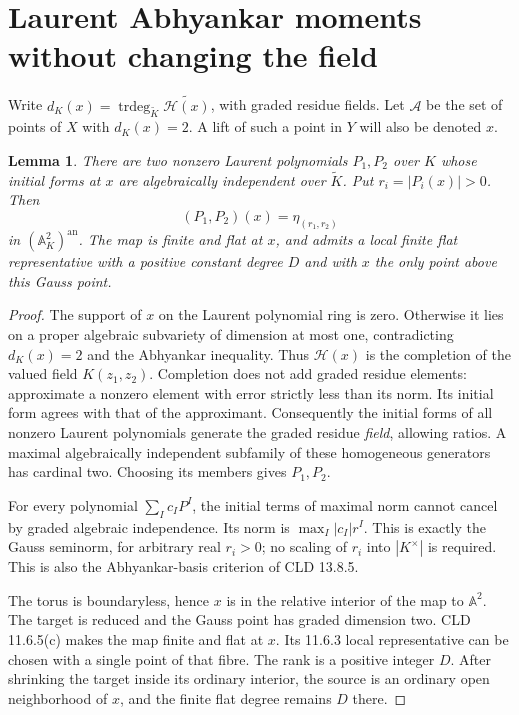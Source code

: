 \documentclass[11pt]{article}
\newtheorem{lemma}[theorem]{Lemma}
\theoremstyle{remark}\newtheorem{remark}[theorem]{Remark}
\begin{document}
\section{Laurent Abhyankar moments without changing the field}
Write $d_K(x)=\operatorname{trdeg}_{\widetilde K}
\widetilde{\mathscr H(x)}$, with graded residue fields.
Let $\mathscr A$ be the set of points of $X$ with $d_K(x)=2$.
A lift of such a point in $Y$ will also be denoted $x$.

\begin{lemma}\label{moments}
There are two nonzero Laurent polynomials $P_1,P_2$ over $K$
whose initial forms at $x$ are algebraically independent over
$\widetilde K$. Put $r_i=|P_i(x)|>0$. Then
\[
 (P_1,P_2)(x)=\eta_{(r_1,r_2)}
\]
in $(\mathbb A_K^2)^{\mathrm{an}}$. The map is finite and flat at
$x$, and admits a local finite flat representative with a positive
constant degree $D$ and with $x$ the only point above this Gauss point.
\end{lemma}
\begin{proof}
The support of $x$ on the Laurent polynomial ring is zero.
Otherwise it lies on a proper algebraic subvariety of dimension
at most one, contradicting $d_K(x)=2$ and the Abhyankar inequality.
Thus $\mathscr H(x)$ is the completion of the valued field
$K(z_1,z_2)$. Completion does not add graded residue elements:
approximate a nonzero element with error strictly less than its
norm. Its initial form agrees with that of the approximant.
Consequently the initial forms of all nonzero Laurent polynomials
generate the graded residue \emph{field}, allowing ratios.
A maximal algebraically independent subfamily of these homogeneous
generators has cardinal two. Choosing its members gives $P_1,P_2$.

For every polynomial $\sum_I c_IP^I$, the initial terms of maximal
norm cannot cancel by graded algebraic independence. Its norm is
$\max_I|c_I|r^I$. This is exactly the Gauss seminorm, for arbitrary
real $r_i>0$; no scaling of $r_i$ into $|K^\times|$ is required.
This is also the Abhyankar-basis criterion of CLD 13.8.5.

The torus is boundaryless, hence $x$ is in the relative interior
of the map to $\mathbb A^2$. The target is reduced and the Gauss
point has graded dimension two. CLD 11.6.5(c) makes the map finite
and flat at $x$. Its 11.6.3 local representative can be chosen
with a single point of that fibre. The rank is a positive integer
$D$. After shrinking the target inside its ordinary interior,
the source is an ordinary open neighborhood of $x$, and the finite
flat degree remains $D$ there.
\end{proof}
\end{document}
